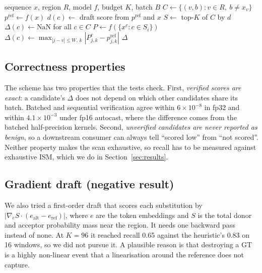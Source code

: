 \documentclass[conference]{IEEEtran}
\begin{document}
\begin{algorithm}[t]
\caption{Speculative ISM}\label{alg:spec}
\begin{algorithmic}[1]
\Require sequence $x$, region $R$, model $f$, budget $K$, batch $B$
\State $C\gets\{(v,b):v\in R,\ b\neq x_v\}$ 
\State $p^{\mathrm{ref}}\gets f(x)$ 
 $d(c)\gets$ draft score from $p^{\mathrm{ref}}$ and $x$ \EndFor
\State $S\gets$ top-$K$ of $C$ by $d$ 
\State $\Delta(c)\gets\mathrm{NaN}$ for all $c\in C$
  \State $P\gets f(\{x^{c}: c\in S_i\})$ 
    \State $\Delta(c)\gets\max_{|j-v|\le W,\,k}|P^{c}_{j,k}-p^{\mathrm{ref}}_{j,k}|$
  \EndFor
\EndFor
\State \Return $\Delta$
\end{algorithmic}
\end{algorithm}

\subsection{Correctness properties}
The scheme has two properties that the tests check. First, \emph{verified scores are exact}: a candidate's $\Delta$ does not depend on which other candidates share its batch. Batched and sequential verification agree within $6\times10^{-8}$ in fp32 and within $4.1\times10^{-3}$ under fp16 autocast, where the difference comes from the batched half-precision kernels. Second, \emph{unverified candidates are never reported as benign}, so a downstream consumer can always tell ``scored low'' from ``not scored''. Neither property makes the scan exhaustive, so recall has to be measured against exhaustive ISM, which we do in Section~\ref{sec:results}.

\subsection{Gradient draft (negative result)}
We also tried a first-order draft that scores each substitution by $|\nabla_e S\cdot(e_{\mathrm{alt}}-e_{\mathrm{ref}})|$, where $e$ are the token embeddings and $S$ is the total donor and acceptor probability mass near the region. It needs one backward pass instead of none. At $K=96$ it reached recall 0.65 against the heuristic's 0.83 on 16 windows, so we did not pursue it. A plausible reason is that destroying a GT is a highly non-linear event that a linearisation around the reference does not capture.
\end{document}
